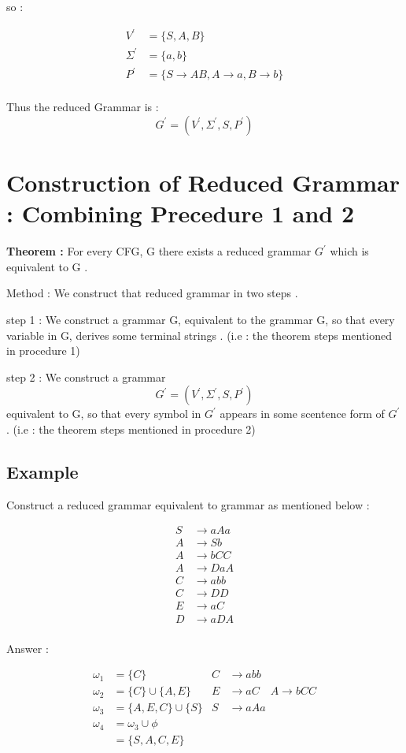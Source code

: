 \documentclass[12pt]{book}
\begin{document}
so :

\begin{align*}
V^{\prime} &= \{ S, A, B \} \\
\Sigma^{\prime} &= \{ a, b \} \\
P^{\prime} &= \{ S \to AB , A \to a , B \to b \} \\
\end{align*}

Thus the reduced Grammar is :
$$
G^{\prime} = ( V^{\prime} , \Sigma^{\prime} , S , P^{\prime})
$$


\section{Construction of Reduced Grammar : Combining Precedure 1 and 2}

\textbf{Theorem : } For every CFG, G there exists a reduced grammar $G^{\prime}$ which is equivalent to G .

Method : We construct that reduced grammar in two steps .

step 1 : We construct a grammar G, equivalent to the grammar G, so that every variable in G, derives some terminal strings .
(i.e : the theorem steps mentioned in procedure 1)

step 2 : We construct a grammar 
$$
G^{\prime} = ( V^{\prime} , \Sigma^{\prime} , S , P^{\prime})
$$
equivalent to G, so that every symbol in $G^{\prime}$ appears in some scentence form of $G^{\prime}$ .
(i.e : the theorem steps mentioned in procedure 2)


\subsection{Example}

Construct a reduced grammar equivalent to grammar as mentioned below :

\begin{align*}
S &\to aAa \\
A &\to Sb \\
A &\to bCC \\
A &\to DaA \\
C &\to abb \\
C &\to DD \\
E &\to aC \\
D &\to aDA \\
\end{align*}


Answer :

\begin{align*}
\omega_{1} &= \{ C \}  & C &\to abb \\
\omega_{2} &= \{ C \} \cup \{ A, E \} & E &\to aC \quad A \to bCC \\
\omega_{3} &= \{ A, E, C \} \cup \{ S \} & S &\to aAa \\
\omega_{4} &= \omega_{3} \cup \phi \\
&= \{ S, A, C, E \} \\
\end{align*}
\end{document}
